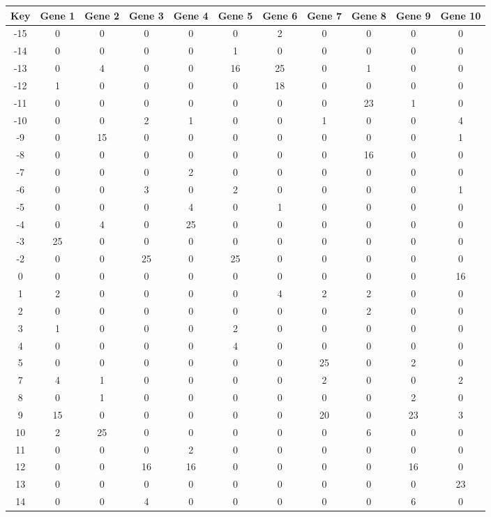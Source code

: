 \begin{tabular}{|c|c|c|c|c|c|c|c|c|c|c|}
\hline
Key & Gene 1 & Gene 2 & Gene 3 & Gene 4 & Gene 5 & Gene 6 & Gene 7 & Gene 8 & Gene 9 & Gene 10 \\
\hline
-15 & 0 & 0 & 0 & 0 & 0 & 2 & 0 & 0 & 0 & 0 \\
-14 & 0 & 0 & 0 & 0 & 1 & 0 & 0 & 0 & 0 & 0 \\
-13 & 0 & 4 & 0 & 0 & 16 & 25 & 0 & 1 & 0 & 0 \\
-12 & 1 & 0 & 0 & 0 & 0 & 18 & 0 & 0 & 0 & 0 \\
-11 & 0 & 0 & 0 & 0 & 0 & 0 & 0 & 23 & 1 & 0 \\
-10 & 0 & 0 & 2 & 1 & 0 & 0 & 1 & 0 & 0 & 4 \\
-9 & 0 & 15 & 0 & 0 & 0 & 0 & 0 & 0 & 0 & 1 \\
-8 & 0 & 0 & 0 & 0 & 0 & 0 & 0 & 16 & 0 & 0 \\
-7 & 0 & 0 & 0 & 2 & 0 & 0 & 0 & 0 & 0 & 0 \\
-6 & 0 & 0 & 3 & 0 & 2 & 0 & 0 & 0 & 0 & 1 \\
-5 & 0 & 0 & 0 & 4 & 0 & 1 & 0 & 0 & 0 & 0 \\
-4 & 0 & 4 & 0 & 25 & 0 & 0 & 0 & 0 & 0 & 0 \\
-3 & 25 & 0 & 0 & 0 & 0 & 0 & 0 & 0 & 0 & 0 \\
-2 & 0 & 0 & 25 & 0 & 25 & 0 & 0 & 0 & 0 & 0 \\
0 & 0 & 0 & 0 & 0 & 0 & 0 & 0 & 0 & 0 & 16 \\
1 & 2 & 0 & 0 & 0 & 0 & 4 & 2 & 2 & 0 & 0 \\
2 & 0 & 0 & 0 & 0 & 0 & 0 & 0 & 2 & 0 & 0 \\
3 & 1 & 0 & 0 & 0 & 2 & 0 & 0 & 0 & 0 & 0 \\
4 & 0 & 0 & 0 & 0 & 4 & 0 & 0 & 0 & 0 & 0 \\
5 & 0 & 0 & 0 & 0 & 0 & 0 & 25 & 0 & 2 & 0 \\
7 & 4 & 1 & 0 & 0 & 0 & 0 & 2 & 0 & 0 & 2 \\
8 & 0 & 1 & 0 & 0 & 0 & 0 & 0 & 0 & 2 & 0 \\
9 & 15 & 0 & 0 & 0 & 0 & 0 & 20 & 0 & 23 & 3 \\
10 & 2 & 25 & 0 & 0 & 0 & 0 & 0 & 6 & 0 & 0 \\
11 & 0 & 0 & 0 & 2 & 0 & 0 & 0 & 0 & 0 & 0 \\
12 & 0 & 0 & 16 & 16 & 0 & 0 & 0 & 0 & 16 & 0 \\
13 & 0 & 0 & 0 & 0 & 0 & 0 & 0 & 0 & 0 & 23 \\
14 & 0 & 0 & 4 & 0 & 0 & 0 & 0 & 0 & 6 & 0 \\
\hline
\end{tabular}
